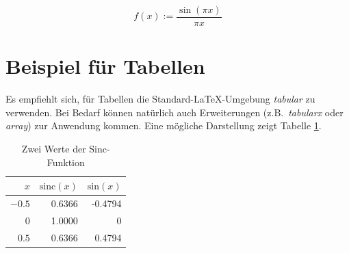 \begin{equation}
	f(x) := \frac{\sin(\pi x)}{\pi x}
	\label{EQ_SAMPLE}
\end{equation}

\section{Beispiel für Tabellen}
%
Es empfiehlt sich, für Tabellen die Standard-\LaTeX{}-Umgebung \emph{tabular} zu verwenden. Bei Bedarf können natürlich auch Erweiterungen (z.B.~\emph{tabularx} oder \emph{array}) zur Anwendung kommen. Eine mögliche Darstellung zeigt Tabelle \ref{Table_Sinc}.

\begin{table}[h!]%
	\begin{center}
	
		\begin{tabular}{|r|r|r|}
			\firsthline
			$x$&$\mathrm{sinc}(x)$&$\mathrm{sin}(x)$\\\hline\hline
			$-0.5$&0.6366&-0.4794\\\hline
			$0$&1.0000&0\\\hline
			$0.5$&0.6366&0.4794\\\hline
		\end{tabular}
		\caption{Zwei Werte der Sinc-Funktion}
		\label{Table_Sinc}
	\end{center}
\end{table}








